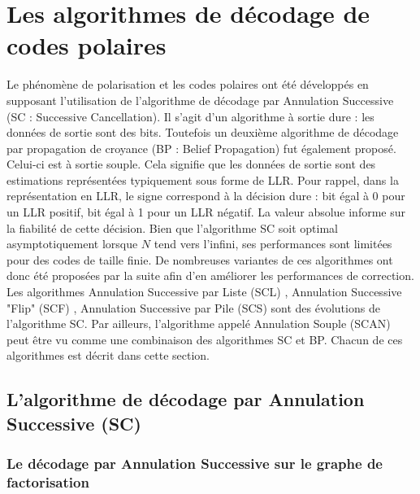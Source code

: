 \section{Les algorithmes de décodage de codes polaires}

Le phénomène de polarisation et les codes polaires ont été développés en supposant l'utilisation de l'algorithme de décodage par Annulation Successive (SC : Successive Cancellation). Il s'agit d'un algorithme à sortie dure : les données de sortie sont des bits. Toutefois un deuxième algorithme de décodage par propagation de croyance (BP : Belief Propagation) fut également proposé. Celui-ci est à sortie souple. Cela signifie que les données de sortie sont des estimations représentées typiquement sous forme de LLR. Pour rappel, dans la représentation en LLR, le signe correspond à la décision dure : bit égal à 0 pour un LLR positif, bit égal à 1 pour un LLR négatif. 
La valeur absolue informe sur la fiabilité de cette décision. Bien que l'algorithme SC soit optimal asymptotiquement lorsque $N$ tend vers l'infini, ses performances sont limitées pour des codes de taille finie. De nombreuses variantes de ces algorithmes ont donc été proposées par la suite afin d'en améliorer les performances de correction. Les algorithmes Annulation Successive par Liste (SCL) \cite{tal_list_2011}, Annulation Successive "Flip" (SCF) \cite{afisiadis_low-complexity_2014}, Annulation Successive par Pile (SCS) \cite{niu_stack_2012} sont des évolutions de l'algorithme SC. Par ailleurs, l'algorithme appelé Annulation Souple (SCAN) \cite{fayyaz_low-complexity_2014} peut être vu comme une combinaison des algorithmes SC et BP. Chacun de ces algorithmes est décrit dans cette section.

\subsection{L'algorithme de décodage par Annulation Successive (SC)}

\subsubsection{Le décodage par Annulation Successive sur le graphe de factorisation}


